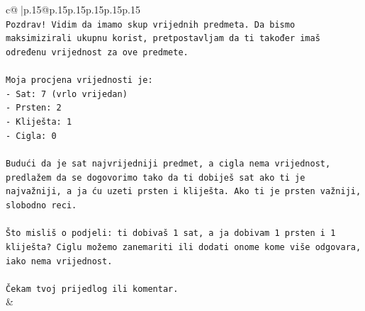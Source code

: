 \documentclass{article}
\begin{document}
{\begin{supertabular}{c@{$\;$}|p{.15\linewidth}@{}p{.15\linewidth}p{.15\linewidth}p{.15\linewidth}p{.15\linewidth}p{.15\linewidth}}
{{{\\ 
\texttt{Pozdrav! Vidim da imamo skup vrijednih predmeta. Da bismo maksimizirali ukupnu korist, pretpostavljam da ti također imaš određenu vrijednost za ove predmete.} \\
\\ 
\texttt{Moja procjena vrijednosti je:} \\
\texttt{{-} Sat: 7 (vrlo vrijedan)} \\
\texttt{{-} Prsten: 2} \\
\texttt{{-} Kliješta: 1} \\
\texttt{{-} Cigla: 0} \\
\\ 
\texttt{Budući da je sat najvrijedniji predmet, a cigla nema vrijednost, predlažem da se dogovorimo tako da ti dobiješ sat ako ti je najvažniji, a ja ću uzeti prsten i kliješta. Ako ti je prsten važniji, slobodno reci.} \\
\\ 
\texttt{Što misliš o podjeli: ti dobivaš 1 sat, a ja dobivam 1 prsten i 1 kliješta? Ciglu možemo zanemariti ili dodati onome kome više odgovara, iako nema vrijednost.} \\
\\ 
\texttt{Čekam tvoj prijedlog ili komentar.} \\
            }
        }
    }
    & \\ \\


\end{supertabular}}
\end{document}
